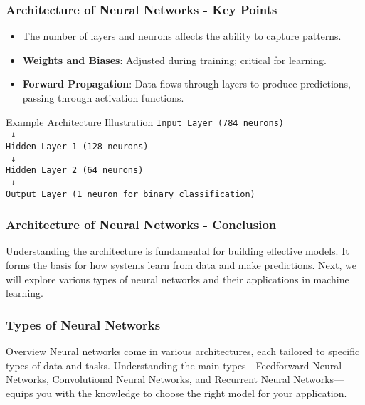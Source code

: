\documentclass[aspectratio=169]{beamer}
\begin{document}
\begin{frame}[fragile]
    \frametitle{Architecture of Neural Networks - Key Points}
    \begin{itemize}
        \item The number of layers and neurons affects the ability to capture patterns.
        \item \textbf{Weights and Biases}: Adjusted during training; critical for learning.
        \item \textbf{Forward Propagation}: Data flows through layers to produce predictions, passing through activation functions.
    \end{itemize}
    
    \begin{block}{Example Architecture Illustration}
        \texttt{Input Layer (784 neurons)} \\
        \texttt{ ↓ } \\
        \texttt{Hidden Layer 1 (128 neurons)} \\
        \texttt{ ↓ } \\
        \texttt{Hidden Layer 2 (64 neurons)} \\
        \texttt{ ↓ } \\
        \texttt{Output Layer (1 neuron for binary classification)}
    \end{block}
\end{frame}

\begin{frame}[fragile]
    \frametitle{Architecture of Neural Networks - Conclusion}
    Understanding the architecture is fundamental for building effective models. 
    It forms the basis for how systems learn from data and make predictions. 
    Next, we will explore various types of neural networks and their applications in machine learning.
\end{frame}

\begin{frame}[fragile]
  \frametitle{Types of Neural Networks}
  \begin{block}{Overview}
    Neural networks come in various architectures, each tailored to specific types of data and tasks. 
    Understanding the main types—Feedforward Neural Networks, Convolutional Neural Networks, and Recurrent Neural Networks—equips you with the knowledge to choose the right model for your application.
  \end{block}
\end{frame}
\end{document}
